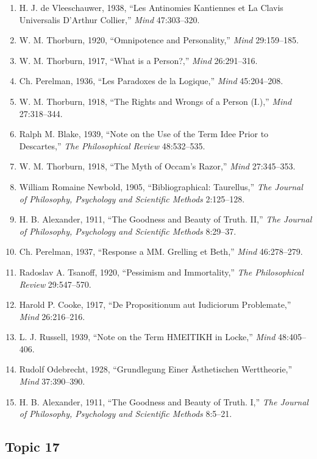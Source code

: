 \documentclass[
]{article}
\begin{document}
\begin{enumerate}
\def\labelenumi{\arabic{enumi}.}
\item
  H. J. de Vleeschauwer, 1938, ``Les Antinomies Kantiennes et La Clavis
  Universalis D'Arthur Collier,'' \emph{Mind} 47:303--320.
\item
  W. M. Thorburn, 1920, ``Omnipotence and Personality,'' \emph{Mind}
  29:159--185.
\item
  W. M. Thorburn, 1917, ``What is a Person?,'' \emph{Mind} 26:291--316.
\item
  Ch. Perelman, 1936, ``Les Paradoxes de la Logique,'' \emph{Mind}
  45:204--208.
\item
  W. M. Thorburn, 1918, ``The Rights and Wrongs of a Person (I.),''
  \emph{Mind} 27:318--344.
\item
  Ralph M. Blake, 1939, ``Note on the Use of the Term Idee Prior to
  Descartes,'' \emph{The Philosophical Review} 48:532--535.
\item
  W. M. Thorburn, 1918, ``The Myth of Occam's Razor,'' \emph{Mind}
  27:345--353.
\item
  William Romaine Newbold, 1905, ``Bibliographical: Taurellus,''
  \emph{The Journal of Philosophy, Psychology and Scientific Methods}
  2:125--128.
\item
  H. B. Alexander, 1911, ``The Goodness and Beauty of Truth. II,''
  \emph{The Journal of Philosophy, Psychology and Scientific Methods}
  8:29--37.
\item
  Ch. Perelman, 1937, ``Response a MM. Grelling et Beth,'' \emph{Mind}
  46:278--279.
\item
  Radoslav A. Tsanoff, 1920, ``Pessimism and Immortality,'' \emph{The
  Philosophical Review} 29:547--570.
\item
  Harold P. Cooke, 1917, ``De Propositionum aut Iudiciorum Problemate,''
  \emph{Mind} 26:216--216.
\item
  L. J. Russell, 1939, ``Note on the Term \Sigma HMEI\Omega TIKH in
  Locke,'' \emph{Mind} 48:405--406.
\item
  Rudolf Odebrecht, 1928, ``Grundlegung Einer Āsthetischen
  Werttheorie,'' \emph{Mind} 37:390--390.
\item
  H. B. Alexander, 1911, ``The Goodness and Beauty of Truth. I,''
  \emph{The Journal of Philosophy, Psychology and Scientific Methods}
  8:5--21.
\end{enumerate}

\newpage

\hypertarget{topic-17}{%
\subsection{Topic 17}\label{topic-17}}
\end{document}
